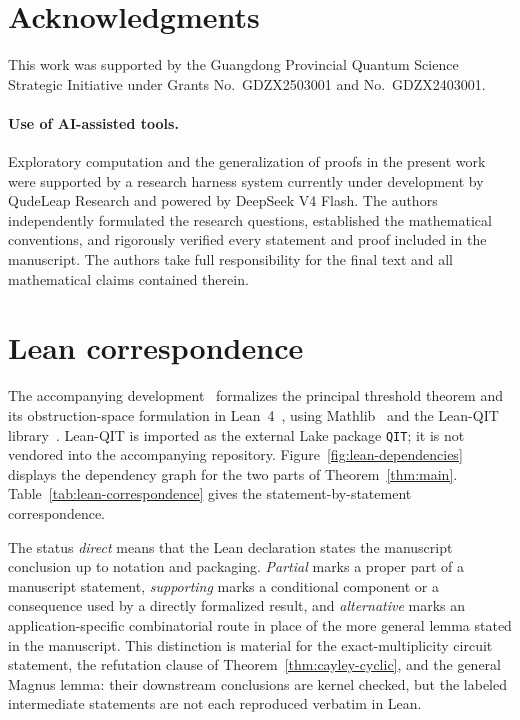 \documentclass[11pt]{article}
\theoremstyle{definition}
\theoremstyle{remark}
\numberwithin{equation}{section}
\begin{document}
\section*{Acknowledgments}
This work was supported by the Guangdong Provincial Quantum Science Strategic Initiative under Grants No.~GDZX2503001 and No.~GDZX2403001.

\paragraph{Use of AI-assisted tools.}
Exploratory computation and the generalization of proofs in the present work were supported by a research harness system currently under development by QudeLeap Research and powered by DeepSeek V4 Flash. The authors independently formulated the research questions, established the mathematical conventions, and rigorously verified every statement and proof included in the manuscript. The authors take full responsibility for the final text and all mathematical claims contained therein.




\appendix
\section{Lean correspondence}\label{app:lean}

The accompanying development~\cite{FourPlayerXORGames2026} formalizes the
principal threshold theorem and its obstruction-space formulation in
Lean~4~\cite{deMouraUllrich2021}, using Mathlib~\cite{mathlib2020} and the
Lean-QIT library~\cite{ZhuEtAl2026LeanQIT}.  Lean-QIT is imported as the
external Lake package \texttt{QIT}; it is not vendored into the accompanying
repository.  Figure~\ref{fig:lean-dependencies} displays the dependency graph
for the two parts of Theorem~\ref{thm:main}.  Table~\ref{tab:lean-correspondence}
gives the statement-by-statement correspondence.

The status \emph{direct} means that the Lean declaration states the
manuscript conclusion up to notation and packaging.  \emph{Partial} marks a
proper part of a manuscript statement, \emph{supporting} marks a conditional
component or a consequence used by a directly formalized result, and
\emph{alternative} marks an application-specific combinatorial route in place
of the more general lemma stated in the manuscript.  This distinction is
material for the exact-multiplicity circuit statement, the refutation clause
of Theorem~\ref{thm:cayley-cyclic}, and the general Magnus lemma: their
downstream conclusions are kernel checked, but the labeled intermediate
statements are not each reproduced verbatim in Lean.
\end{document}
